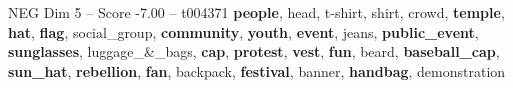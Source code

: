 \begin{textsample}{NEG Dim 5 – Score -7.00 – t004371}  \label{ex:f5_neg_015}
\textbf{people}, head, t-shirt, shirt, crowd, \textbf{temple}, \textbf{hat}, \textbf{flag}, social\_group, \textbf{community}, \textbf{youth}, \textbf{event}, jeans, \textbf{public\_event}, \textbf{sunglasses}, luggage\_\&\_bags, \textbf{cap}, \textbf{protest}, \textbf{vest}, \textbf{fun}, beard, \textbf{baseball\_cap}, \textbf{sun\_hat}, \textbf{rebellion}, \textbf{fan}, backpack, \textbf{festival}, banner, \textbf{handbag}, demonstration

\end{textsample}

